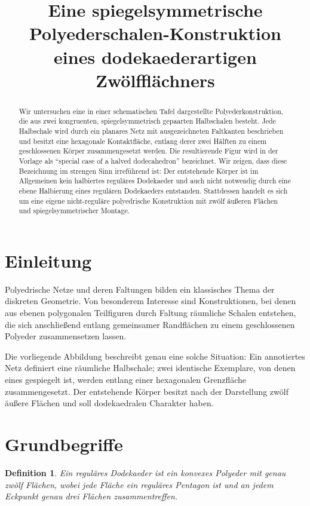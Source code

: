 \documentclass[11pt]{article}
\title{Eine spiegelsymmetrische Polyederschalen-Konstruktion\\
	eines dodekaederartigen Zwölfflächners}
\author{}
\date{}
\newtheorem{definition}[satz]{Definition}
\begin{document}
	\maketitle
	
	\begin{abstract}
		Wir untersuchen eine in einer schematischen Tafel dargestellte Polyederkonstruktion, die aus zwei kongruenten, spiegelsymmetrisch gepaarten Halbschalen besteht. Jede Halbschale wird durch ein planares Netz mit ausgezeichneten Faltkanten beschrieben und besitzt eine hexagonale Kontaktfläche, entlang derer zwei Hälften zu einem geschlossenen Körper zusammengesetzt werden. Die resultierende Figur wird in der Vorlage als ``special case of a halved dodecahedron'' bezeichnet. Wir zeigen, dass diese Bezeichnung im strengen Sinn irreführend ist: Der entstehende Körper ist im Allgemeinen kein halbiertes reguläres Dodekaeder und auch nicht notwendig durch eine ebene Halbierung eines regulären Dodekaeders entstanden. Stattdessen handelt es sich um eine eigene nicht-reguläre polyedrische Konstruktion mit zwölf äußeren Flächen und spiegelsymmetrischer Montage.
	\end{abstract}
	
	\section{Einleitung}
	
	Polyedrische Netze und deren Faltungen bilden ein klassisches Thema der diskreten Geometrie. Von besonderem Interesse sind Konstruktionen, bei denen aus ebenen polygonalen Teilfiguren durch Faltung räumliche Schalen entstehen, die sich anschließend entlang gemeinsamer Randflächen zu einem geschlossenen Polyeder zusammensetzen lassen.
	
	Die vorliegende Abbildung beschreibt genau eine solche Situation: Ein annotiertes Netz definiert eine räumliche Halbschale; zwei identische Exemplare, von denen eines gespiegelt ist, werden entlang einer hexagonalen Grenzfläche zusammengesetzt. Der entstehende Körper besitzt nach der Darstellung zwölf äußere Flächen und soll dodekaedralen Charakter haben.
	
	\section{Grundbegriffe}
	
	\begin{definition}
		Ein \emph{reguläres Dodekaeder} ist ein konvexes Polyeder mit genau zwölf Flächen, wobei jede Fläche ein reguläres Pentagon ist und an jedem Eckpunkt genau drei Flächen zusammentreffen.
	\end{definition}
	
\end{document}
